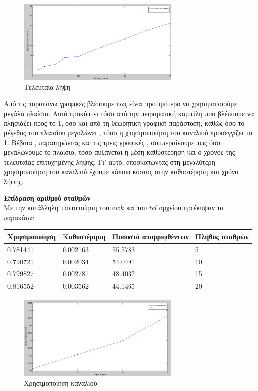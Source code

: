 \documentclass{article}%
\begin{document}
\begin{figure}[htbp]
	\centering
		\includegraphics[width=0.7\textwidth]{3.png}
	\caption{Τελευταία λήψη}
	\label{fig:3}
	\end{figure}
	
	\newpage
	
Από τις παραπάνω γραφικές βλέπουμε πως είναι προτιμότερο να χρησιμοποιούμε μεγάλα πλαίσια. Αυτό προκύπτει τόσο από την πειραματική καμπύλη που βλέπουμε να πλησιάζει προς το 1, όσο και από τη θεωρητική γραφική παράσταση, καθώς όσο το μέγεθος του πλαισίου μεγαλώνει , τόσο η χρησιμοποιήση του καναλιού προσεγγίζει το 1. Βέβαια , παρατηρώντας και τις τρεις γραφικές , συμπεραίνουμε πως όσο μεγαλώνουμε το πλαίσιο, τόσο αυξάνεται η μέση καθυστέρηση και ο χρόνος της τελευταίας επιτυχημένης λήψης. Γι' αυτό, αποσκοπώντας στη μεγαλύτερη χρησιμοποίηση του καναλιού έχουμε κάποιο κόστος στην καθυστέρηση και  χρόνο λήψης.


\textbf{\large{Επίδραση αριθμού σταθμών}}\\

Με την κατάλληλη τροποποίηση του $awk$ και του $tcl$ αρχείου προέκυψαν τα παρακάτω:
\begin{table}[h]
\begin{tabular}{|l|l|l|l|}
\hline
Χρησιμοποίηση & Καθυστέρηση & Ποσοστό απορριφθέντων & Πλήθος σταθμών \\ \hline
0.781441      & 0.002163    & 55.5783               & 5              \\ \hline
0.790721      & 0.002034    & 54.0491               & 10             \\ \hline
0.799827      & 0.002781    & 48.4032               & 15             \\ \hline
0.816552      & 0.003562    & 44.1465               & 20             \\ \hline
\end{tabular}
\end{table}
\begin{figure}[htbp]
	\centering
		\includegraphics[width=0.7\textwidth]{4.png}
	\caption{Χρησιμοποίηση καναλιού}
	\label{fig:4}
\end{figure}
\end{document}

